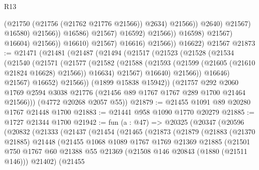 \begin{lexlean}{R13}
\begin{coremodule}
                                                  (@21750 (@21756 (@21762 @21776 @21566)) @2634)
                                                  @21566))
                                              @2640)
                                            @21567)
                                          @16580)
                                        @21566))
                                    @16586)
                                  @21567)
                                @16592)
                              @21566))
                          @16598)
                        @21567)
                      @16604)
                    @21566))
                @16610)
              @21567)
            @16616)
          @21566))
      @16622)
    @21567
@21873 := @21471
    (@21481
      (@21487
        (@21494
          (@21517
            (@21523
              (@21528
                (@21534
                  (@21540
                    (@21571
                      (@21577
                        (@21582
                          (@21588
                            (@21593 (@21599 (@21605 (@21610 @21824 @16628) @21566)) @16634)
                            @21567)
                          @16640)
                        @21566))
                    @16646)
                  @21567)
                @16652)
              @21566))
          (@1899 @15838 @15942))
        (@21757
          @292
          @2060
          @1769
          @2594
          @3038
          @21776
          (@21456 @89 @1767 @1767 @289 @1700 @21464 @21566)))
      (@4772 @20268 @2057 @55))
@21879 := @21455 @1091 @89 @20280 @1767 @21448 @1700
@21883 := @21441 @958 @1090 @1770 @20279
@21885 := @1727 @21344 @1700
@21942 := fun (a : @47) =>
  @20325
    (@20347
      (@20596
        (@20832
          (@21333
            (@21437
              (@21454
                (@21465
                  (@21873
                    (@21879
                      (@21883
                        (@21370 @21885)
                        @21448
                        (@21455
                          @1068
                          @1089
                          @1767
                          @1769
                          @21369
                          @21885
                          (@21501
                            @750
                            @1767
                            @60
                            @21388
                            @55
                            @21369
                            (@21508 @146 @20843 (@1880 (@21511 @146)))
                            @21402)
                          (@21455

\end{coremodule}
\end{lexlean}
